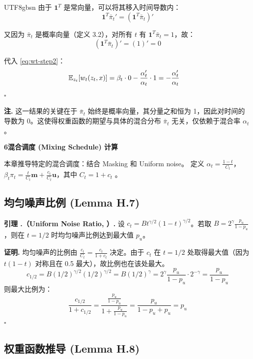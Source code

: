 \documentclass[11pt,a4paper]{article}
\newcounter{lemma}[section]
\renewcommand{\thelemma}{\thesection.\arabic{lemma}}
\begin{document}
\begin{CJK}{UTF8}{gbsn}
由于 $\mathbf{1}^T$ 是常向量，可以将其移入时间导数内：
\[
\mathbf{1}^T \bar{\pi}_t' = (\mathbf{1}^T \bar{\pi}_t)'
\]

又因为 $\bar{\pi}_t$ 是概率向量（定义 3.2），对所有 $t$ 有 $\mathbf{1}^T \bar{\pi}_t = 1$，故：
\[
(\mathbf{1}^T \bar{\pi}_t)' = (1)' = 0
\]

代入 \eqref{eq:wt-step2}：
\begin{align}
\mathbb{E}_{z_t}[w_t(z_t, x)] &= \beta_t \cdot 0 - \frac{\alpha_t'}{\alpha_t} \cdot 1 = -\frac{\alpha_t'}{\alpha_t} \notag
\end{align}
\hfill $\square$

\textbf{注.} 这一结果的关键在于 $\bar{\pi}_t$ 始终是概率向量，其分量之和恒为 1，因此对时间的导数为 0。这使得权重函数的期望与具体的混合分布 $\bar{\pi}_t$ 无关，仅依赖于混合率 $\alpha_t$。


\begin{center}
{\LARGE\bfseries 6\quad 混合调度 (Mixing Schedule) 计算}
\end{center}

\setcounter{section}{6}
\setcounter{subsection}{0}

本章推导特定的混合调度：结合 Masking 和 Uniform noise。
定义 $\alpha_t = \frac{1-t}{C_t}$，$\beta_t \pi_t = \frac{t}{C_t}\mathbf{m} + \frac{c_t}{C_t}\mathbf{u}$，其中 $C_t = 1 + c_t$ 。

\subsection{均匀噪声比例 (Lemma H.7)}

\begin{lembox}
\textbf{引理 \thelemma（Uniform Noise Ratio, ）.}
设 $c_t = B t^{\gamma/2} (1-t)^{\gamma/2}$。若取 $B = 2^\gamma \frac{p_u}{1-p_u}$，则在 $t=1/2$ 时均匀噪声比例达到最大值 $p_u$。
\end{lembox}

\textbf{证明.}
均匀噪声的比例由 $\frac{c_t}{C_t} = \frac{c_t}{1+c_t}$ 决定。由于 $c_t$ 在 $t=1/2$ 处取得最大值（因为 $t(1-t)$ 对称且在 0.5 最大），故比例也在该处最大。
\[
c_{1/2} = B (1/2)^{\gamma/2} (1/2)^{\gamma/2} = B (1/2)^\gamma = 2^\gamma \frac{p_u}{1-p_u} \cdot 2^{-\gamma} = \frac{p_u}{1-p_u}
\]
则最大比例为：
\[
\frac{c_{1/2}}{1+c_{1/2}} = \frac{\frac{p_u}{1-p_u}}{1 + \frac{p_u}{1-p_u}} = \frac{p_u}{1-p_u + p_u} = p_u
\]
\hfill $\square$

\subsection{权重函数推导 (Lemma H.8)}


\end{CJK}
\end{document}
